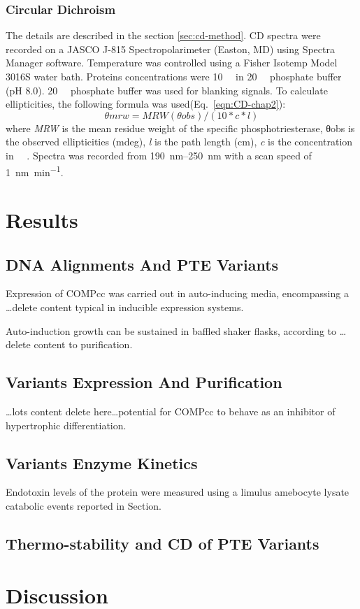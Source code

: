 \begin{refsection}
\subsubsection{Circular Dichroism}

The details are described in the section \ref{sec:cd-method}. CD spectra were
recorded on a JASCO J-815 Spectropolarimeter (Easton, MD) using Spectra Manager
software. Temperature was controlled using a Fisher Isotemp Model 3016S water
bath. Proteins concentrations were \SI{10}{\micro\Molar} in
\SI{20}{\milli\Molar} phosphate buffer (pH 8.0). \SI{20}{\milli\Molar}
phosphate buffer was used for blanking signals. To calculate ellipticities, the
following formula was used(Eq.~\ref{eqn:CD-chap2}): 
\begin{equation}
    θmrw = MRW(θobs) / (10 * c * l)
    \label{eqn:CD-chap2}
\end{equation}
where \emph{MRW} is the mean residue weight of the specific phosphotriesterase,
θobs is the observed ellipticities (mdeg), \emph{l} is the path length (cm),
\emph{c} is the concentration in \SI{}{\micro\Molar}. Spectra was recorded from
\SIrange{190}{250}{\nm} with a scan speed of \SI{1}{\nano\meter\per\minute}.

\section{Results}

\subsection{DNA Alignments And PTE Variants}

Expression of COMPcc was carried out in auto-inducing media, encompassing a
\ldots delete content typical in inducible expression systems.

Auto-induction growth can be sustained in baffled shaker flasks, according to
\ldots delete content to purification.

\subsection{Variants Expression And Purification}

\ldots lots content delete here\ldots potential for COMPcc to behave as an
inhibitor of hypertrophic differentiation.

\subsection{Variants Enzyme Kinetics}

Endotoxin levels of the protein were measured using a limulus amebocyte lysate
catabolic events reported in Section.

\subsection{Thermo-stability and CD of PTE Variants}

\section{Discussion}

\printbibliography[heading=subbibliography]

\end{refsection}
